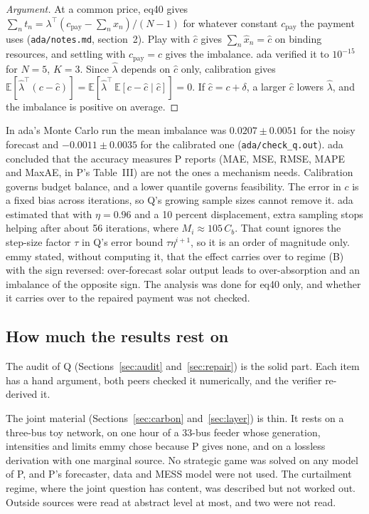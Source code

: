 \documentclass{article}
\begin{document}
\begin{proof}[Argument]
At a common price, eq40 gives \(\sum_nt_n=\lambda^\top(c_{\mathrm{pay}}-\sum_nx_n)/(N-1)\) for whatever constant \(c_{\mathrm{pay}}\) the payment uses (\texttt{ada/notes.md}, section~2).
Play with \(\hat c\) gives \(\sum_n\hat x_n=\hat c\) on binding resources, and settling with \(c_{\mathrm{pay}}=c\) gives the imbalance.
ada verified it to \(10^{-15}\) for \(N=5\), \(K=3\).
Since \(\hat\lambda\) depends on \(\hat c\) only, calibration gives \(\mathbb{E}[\hat\lambda^\top(c-\hat c)]=\mathbb{E}[\hat\lambda^\top\,\mathbb{E}[c-\hat c\mid\hat c]]=0\).
If \(\hat c=c+\delta\), a larger \(\hat c\) lowers \(\hat\lambda\), and the imbalance is positive on average.
\end{proof}

In ada's Monte Carlo run the mean imbalance was \(0.0207\pm0.0051\) for the noisy forecast and \(-0.0011\pm0.0035\) for the calibrated one (\texttt{ada/check\_q.out}).
ada concluded that the accuracy measures P reports (MAE, MSE, RMSE, MAPE and MaxAE, in P's Table~III) are not the ones a mechanism needs.
Calibration governs budget balance, and a lower quantile governs feasibility.
The error in \(c\) is a fixed bias across iterations, so Q's growing sample sizes cannot remove it.
ada estimated that with \(\eta=0.96\) and a 10 percent displacement, extra sampling stops helping after about 56 iterations, where \(M_i\approx105\,C_b\).
That count ignores the step-size factor \(\tau\) in Q's error bound \(\tau\eta^{i+1}\), so it is an order of magnitude only.
emmy stated, without computing it, that the effect carries over to regime (B) with the sign reversed: over-forecast solar output leads to over-absorption and an imbalance of the opposite sign.
The analysis was done for eq40 only, and whether it carries over to the repaired payment was not checked.

\subsection{How much the results rest on}\label{sec:weight}

The audit of Q (Sections~\ref{sec:audit} and~\ref{sec:repair}) is the solid part.
Each item has a hand argument, both peers checked it numerically, and the verifier re-derived it.

The joint material (Sections~\ref{sec:carbon} and~\ref{sec:layer}) is thin.
It rests on a three-bus toy network, on one hour of a 33-bus feeder whose generation, intensities and limits emmy chose because P gives none, and on a lossless derivation with one marginal source.
No strategic game was solved on any model of P, and P's forecaster, data and MESS model were not used.
The curtailment regime, where the joint question has content, was described but not worked out.
Outside sources were read at abstract level at most, and two were not read.
\end{document}
